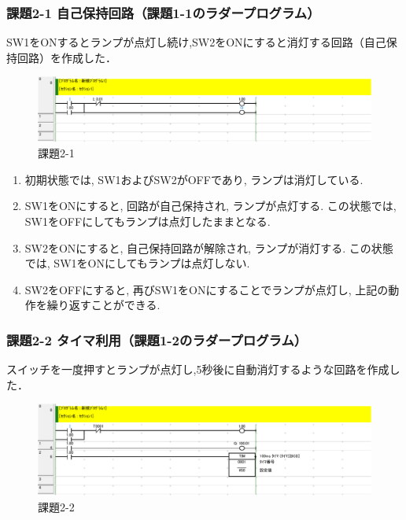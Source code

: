 \subsubsection*{課題2-1 自己保持回路（課題1-1のラダープログラム）}
SW1をONするとランプが点灯し続け,SW2をONにすると消灯する回路（自己保持回路）を作成した．

\begin{figure}[H]
  \centering
  \includegraphics[scale=1]{sozai/2-1-crop.pdf}
  \caption{課題2-1}
\end{figure}

\begin{enumerate}
  \item 初期状態では, SW1およびSW2がOFFであり, ランプは消灯している.
  \item SW1をONにすると, 回路が自己保持され, ランプが点灯する. この状態では, SW1をOFFにしてもランプは点灯したままとなる.
  \item SW2をONにすると, 自己保持回路が解除され, ランプが消灯する. この状態では, SW1をONにしてもランプは点灯しない.
  \item SW2をOFFにすると, 再びSW1をONにすることでランプが点灯し, 上記の動作を繰り返すことができる.
\end{enumerate}


\subsubsection*{課題2-2 タイマ利用（課題1-2のラダープログラム）}
スイッチを一度押すとランプが点灯し,5秒後に自動消灯するような回路を作成した．
\begin{figure}[H]
  \centering
  \includegraphics[scale=1]{sozai/2-2-crop.pdf}
  \caption{課題2-2}
\end{figure}

